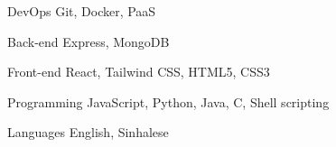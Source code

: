 

\begin{cvskills}

  \cvskill
    {DevOps} %
    {Git, Docker, PaaS} %

  \cvskill
    {Back-end} %
    {Express, MongoDB} %

  \cvskill
    {Front-end} %
    {React, Tailwind CSS, HTML5, CSS3} %

  \cvskill
    {Programming} %
    {JavaScript, Python, Java, C, Shell scripting} %

  \cvskill
    {Languages} %
    {English, Sinhalese} %

\end{cvskills}
